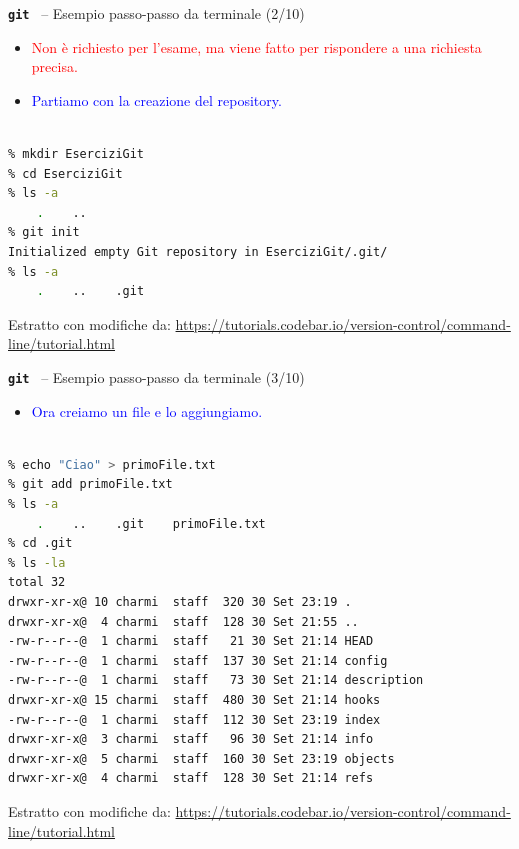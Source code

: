 \documentclass{beamer}
\newcommand{\git}{\texttt{\textbf{git}}\xspace}
\begin{document}
\begin{frame}[fragile]{\centerline{\git ~ -- Esempio passo-passo da terminale (2/10)}}
\begin{itemize}
\item \textcolor{red}{Non \`{e} richiesto per l'esame, ma viene fatto per rispondere a una richiesta precisa.}\\
\item \textcolor{blue}{Partiamo con la creazione del repository.}
\end{itemize}
\begin{lstlisting}[language=sh]

% mkdir EserciziGit
% cd EserciziGit  
% ls -a
    .    ..
% git init  
Initialized empty Git repository in EserciziGit/.git/
% ls -a
    .    ..    .git
\end{lstlisting}

\begin{center}
    \tiny Estratto con modifiche da: \url{https://tutorials.codebar.io/version-control/command-line/tutorial.html}
\end{center}

\end{frame}

\begin{frame}[fragile]{\centerline{\git ~ -- Esempio passo-passo da terminale (3/10)}}
\begin{itemize}
\item \textcolor{blue}{Ora creiamo un file e lo aggiungiamo.}
\end{itemize}
\begin{lstlisting}[language=sh]

% echo "Ciao" > primoFile.txt
% git add primoFile.txt
% ls -a
    .    ..    .git    primoFile.txt
% cd .git
% ls -la
total 32
drwxr-xr-x@ 10 charmi  staff  320 30 Set 23:19 .
drwxr-xr-x@  4 charmi  staff  128 30 Set 21:55 ..
-rw-r--r--@  1 charmi  staff   21 30 Set 21:14 HEAD
-rw-r--r--@  1 charmi  staff  137 30 Set 21:14 config
-rw-r--r--@  1 charmi  staff   73 30 Set 21:14 description
drwxr-xr-x@ 15 charmi  staff  480 30 Set 21:14 hooks
-rw-r--r--@  1 charmi  staff  112 30 Set 23:19 index
drwxr-xr-x@  3 charmi  staff   96 30 Set 21:14 info
drwxr-xr-x@  5 charmi  staff  160 30 Set 23:19 objects
drwxr-xr-x@  4 charmi  staff  128 30 Set 21:14 refs

\end{lstlisting}

\begin{center}
    \tiny Estratto con modifiche da: \url{https://tutorials.codebar.io/version-control/command-line/tutorial.html}
\end{center}

\end{frame}
\end{document}
